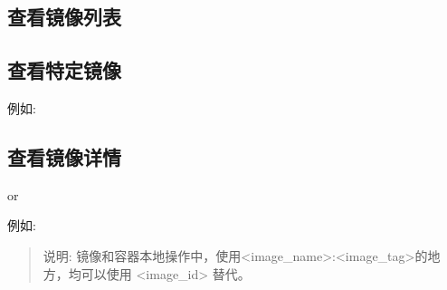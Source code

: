 \documentclass[letterpaper,10pt,english]{sphinxmanual}
\begin{document}
\subsection{查看镜像列表}
\label{\detokenize{docker/basic_cmd:id5}}
\begin{sphinxVerbatim}[commandchars=\\\{\}]
  
\end{sphinxVerbatim}


\subsection{查看特定镜像}
\label{\detokenize{docker/basic_cmd:id6}}
\begin{sphinxVerbatim}[commandchars=\\\{\}]
   
\end{sphinxVerbatim}

例如:

\begin{sphinxVerbatim}[commandchars=\\\{\}]
   
\end{sphinxVerbatim}


\subsection{查看镜像详情}
\label{\detokenize{docker/basic_cmd:id7}}
\begin{sphinxVerbatim}[commandchars=\\\{\}]
   
\end{sphinxVerbatim}

or

\begin{sphinxVerbatim}[commandchars=\\\{\}]
   
\end{sphinxVerbatim}

例如:

\begin{sphinxVerbatim}[commandchars=\\\{\}]
   
   
\end{sphinxVerbatim}
\begin{quote}

说明: 镜像和容器本地操作中，使用\textless{}image\_name\textgreater{}:\textless{}image\_tag\textgreater{}的地方，均可以使用 \textless{}image\_id\textgreater{} 替代。
\end{quote}
\end{document}
